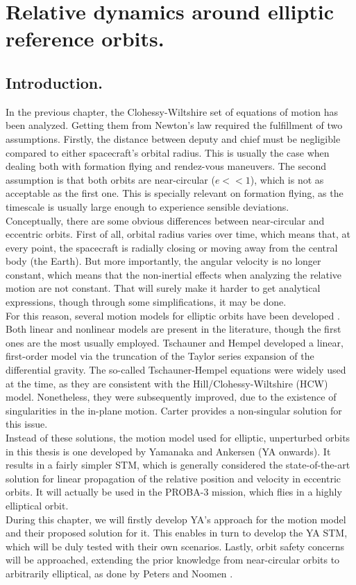 \chapter{Relative dynamics around elliptic reference orbits.}
%
\label{chap: Eccentric}
%
\section{Introduction.}
%
\indent In the previous chapter, the Clohessy-Wiltshire set of equations of motion has been analyzed. Getting them from Newton's law required the fulfillment of two assumptions. Firstly, the distance between deputy and chief must be negligible compared to either spacecraft's orbital radius. This is usually the case when dealing both with formation flying and rendez-vous maneuvers. The second assumption is that both orbits are near-circular ($e<<1$), which is not as acceptable as the first one. This is specially relevant on formation flying, as the timescale is usually large enough to experience sensible deviations. \\
%
\indent Conceptually, there are some obvious differences between near-circular and eccentric orbits. First of all, orbital radius varies over time, which means that, at every point, the spacecraft is radially closing or moving away from the central body (\ie the Earth). But more importantly, the angular velocity is no longer constant, which means that the non-inertial effects when analyzing the relative motion are not constant. That will surely make it harder to get analytical expressions, though through some simplifications, it may be done.\\
%
\indent For this reason, several motion models for elliptic orbits have been developed \cite{Sullivan}. Both linear and nonlinear models are present in the literature, though the first ones are the most usually employed. Tschauner and Hempel \cite{Tschauner_Hempel} developed a linear, first-order model via the truncation of the Taylor series expansion of the differential gravity. The so-called Tschauner-Hempel equations were widely used at the time, as they are consistent with the Hill/Clohessy-Wiltshire (HCW) model. Nonetheless, they were subsequently improved, due to the existence of singularities in the in-plane motion. Carter \cite{Carter} provides a non-singular solution for this issue. \\
%
\indent Instead of these solutions, the motion model used for elliptic, unperturbed orbits in this thesis is one developed by Yamanaka and Ankersen \cite{Yamanaka_ankersen} (YA onwards). It results in a fairly simpler STM, which is generally considered the state-of-the-art solution for linear propagation of the relative position and velocity in eccentric orbits. It will actually be used in the PROBA-3 mission, which flies in a highly elliptical orbit.\\
%
\indent During this chapter, we will firstly develop YA's approach for the motion model and their proposed solution for it. This enables in turn to develop the YA STM, which will be duly tested with their own scenarios. Lastly, orbit safety concerns will be approached, extending the prior knowledge from near-circular orbits to arbitrarily elliptical, as done by Peters and Noomen \cite{Peters_Noomen}.
%
